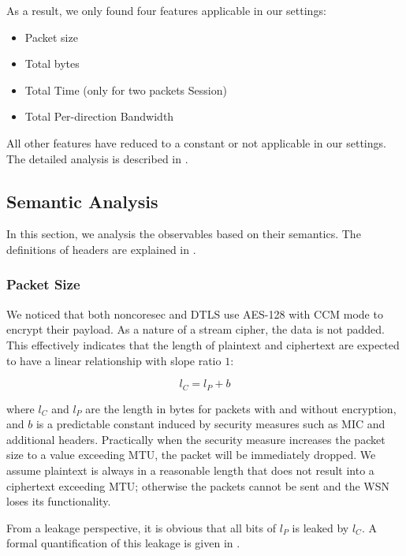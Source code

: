 As a result, we only found four features applicable in our settings:
\begin{itemize}
	\item Packet size
	\item Total bytes
	\item Total Time (only for two packets Session)
	\item Total Per-direction Bandwidth
\end{itemize}

All other features have reduced to a constant or not applicable in our settings. The detailed analysis is described in .

\subsection{Semantic Analysis}

In this section, we analysis the observables based on their semantics. The definitions of headers are explained in .

\subsubsection{Packet Size}

We noticed that both noncoresec and DTLS use AES-128 with CCM mode to encrypt their payload. As a nature of a stream cipher, the data is not padded. This effectively indicates that the length of plaintext and ciphertext are expected to have a linear relationship with slope ratio $1$:

\begin{equation} \label{Eq: Linear Length}
	l_{C} = l_{P} + b
\end{equation}

where $l_{C}$ and $l_{P}$ are the length in bytes for packets with and without encryption, and $b$ is a predictable constant induced by security measures such as MIC and additional headers. Practically when the security measure increases the packet size to a value exceeding MTU, the packet will be immediately dropped. We assume plaintext is always in a reasonable length that does not result into a ciphertext exceeding MTU; otherwise the packets cannot be sent and the WSN loses its functionality.

From a leakage perspective, it is obvious that all bits of $l_P$ is leaked by $l_C$. A formal quantification of this leakage is given in .


